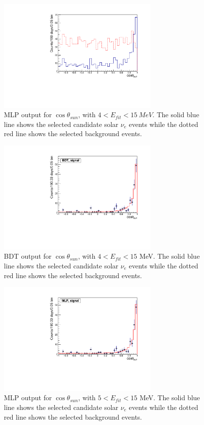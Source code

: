 \begin{figure}[!htb]
	\centering
	\includegraphics[width=8cm]{cosThetaToSun_4to15_MLP.pdf}
	\caption[MLP output for $\cos\theta_{sun}$, with $4<E_{fit}<15$~MeV.]{MLP output for $\cos\theta_{sun}$, with $4<E_{fit}<15~MeV$. The solid blue line shows the selected candidate solar $\nu_e$ events while the dotted red line shows the selected background events.}
	\label{cosThetaToSun_4to15_MLP}
\end{figure}

\begin{figure}[!htb]
	\centering
	\includegraphics[width=8cm]{cosThetaToSun_5to15_BDT.pdf}
	\caption[BDT output for $\cos\theta_{sun}$, with $4<E_{fit}<15$ MeV.]{BDT output for $\cos\theta_{sun}$, with $4<E_{fit}<15$ MeV. The solid blue line shows the selected candidate solar $\nu_e$ events while the dotted red line shows the selected background events.}
	\label{cosThetaToSun_5to15_BDT}
\end{figure}

\begin{figure}[!htb]
	\centering
	\includegraphics[width=8cm]{cosThetaToSun_5to15_MLP.pdf}
	\caption[MLP output for $\cos\theta_{sun}$, with $5<E_{fit}<15$ MeV.]{MLP output for $\cos\theta_{sun}$, with $5<E_{fit}<15$ MeV. The solid blue line shows the selected candidate solar $\nu_e$ events while the dotted red line shows the selected background events.}
	\label{cosThetaToSun_5to15_MLP}
\end{figure}

